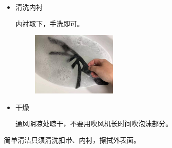 \documentclass{ctexbook}
\begin{document}
\begin{itemize}
\item 清洗内衬

内衬取下，手洗即可。
\begin{figure}[H]
    \begin{center}
    \includegraphics[width=0.4\textwidth]{fig/头盔清洁4}
    \end{center}
\end{figure}

\item 干燥
 
通风阴凉处晾干，不要用吹风机长时间吹泡沫部分。

\end{itemize}

简单清洁只须清洗扣带、内衬，擦拭外表面。

    

    

\end{document}
